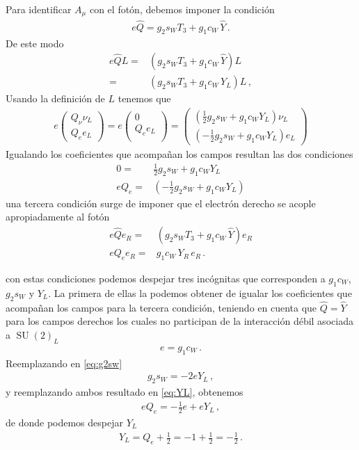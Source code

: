 \begin{frame}
Para identificar $A_{\mu}$ con el fotón, debemos imponer la condición
\begin{align}
  \label{eq:relgn}
e\widehat{Q}=g_2 s_W T_3+{g_1}c_W\,\widehat{Y}\,.
\end{align}
De este modo
\begin{align}
  e\widehat{Q}L =& \left(g_2 s_W T_3+{g_1}c_W\,\widehat{Y}\right) L \nonumber\\
=& \left(g_2 s_W T_3+{g_1}c_W\,Y_L\right) L \,,
\end{align}
Usando la definición de $L$ tenemos que
\begin{align}
 e
  \begin{pmatrix}
    Q_{\nu} \nu_L\\
       Q_e e_L 
 \end{pmatrix}=
    e\begin{pmatrix}
   0\\
      Q_e e_L \\
  \end{pmatrix}=
  \begin{pmatrix}
   \left( \frac{1}{2}g_2 s_W +g_1 c_W Y_L \right) \nu_L\\ 
 \left(  -\frac{1}{2}g_2 s_W +g_1 c_W Y_L \right) e_L
  \end{pmatrix}
\end{align}
Igualando los coeficientes que acompañan los campos resultan las dos condiciones
\begin{align}
  \label{eq:g2sw}
  0= & \frac{1}{2}g_2 s_W +g_1 c_W Y_L  \\
    \label{eq:YL}
e Q_e=& \left(  -\frac{1}{2}g_2 s_W +g_1 c_W Y_L \right)
\end{align}
una tercera condición surge de imponer que el electrón derecho se acople apropiadamente al fotón
\begin{align}
  \label{eq:erel}
 e\widehat{Q} e_R =& \left(g_2 s_W T_3+{g_1}c_W\,\widehat{Y}\right) e_R\nonumber\\  
e Q_e e_R=& g_1 c_W\,Y_R \, e_R\,.
\end{align}
\end{frame}
con estas condiciones podemos despejar tres incógnitas que corresponden a $g_1c_W$, $g_2s_W$ y $Y_L$.
La primera de ellas la podemos obtener de 
igualar los coeficientes que acompañan los campos para la tercera condición, teniendo en cuenta que $\widehat{Q}=\widehat{Y}$ para los campos derechos los cuales no participan de la interacción
débil asociada a $\operatorname{SU}(2)_L$
\begin{align}
  e=g_1 c_W\,.
\end{align}
Reemplazando en \eqref{eq:g2sw}
\begin{align}
  g_2 s_W = -2e Y_L\,,
\end{align}
y reemplazando ambos resultado en \eqref{eq:YL}, obtenemos
\begin{align}
  eQ_e=-\frac{1}{2} e+eY_L\,,
\end{align}
de donde podemos despejar $Y_L$ 
\begin{align}
  Y_L=Q_e+\frac{1}{2}=-1+\frac{1}{2}=-\frac{1}{2}\,.
\end{align}

